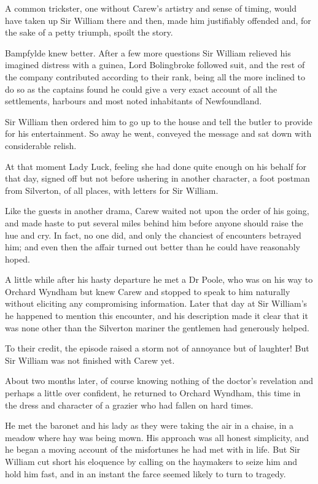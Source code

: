 A common trickster, one without Carew's artistry and sense of timing, would have taken up Sir William there and then, made him justifiably offended and, for the sake of a petty triumph, spoilt the story.

Bampfylde knew better. After a few more questions Sir William relieved his imagined distress with a guinea, Lord Bolingbroke followed suit, and the rest of the company contributed according to their rank, being all the more inclined to do so as the captains found he could give a very exact account of all the settlements, harbours and most noted inhabitants of Newfoundland.

Sir William then ordered him to go up to the house and tell the butler to provide for his entertainment. So away he went, conveyed the message and sat down with considerable relish.

At that moment Lady Luck, feeling she had done quite enough on his behalf for that day, signed off   but not before ushering in another character, a foot postman from Silverton, of all places, with letters for Sir William.

Like the guests in another drama, Carew waited not upon the order of his going, and made haste to put several miles behind him before anyone should raise the hue and cry. In fact, no one did, and only the chanciest of encounters betrayed him; and even then the affair turned out better than he could have reasonably hoped.

A little while after his hasty departure he met a Dr Poole, who was on his way to Orchard Wyndham but knew Carew and stopped to speak to him   naturally without eliciting any compromising information. Later that day at Sir William's he happened to mention this encounter, and his description made it clear that it was none other than the Silverton mariner the gentlemen had generously helped.

To their credit, the episode raised a storm not of annoyance but of laughter! But Sir William was not finished with Carew yet.

About two months later, of course knowing nothing of the doctor's revelation and perhaps a little over confident, he returned to Orchard Wyndham, this time in the dress and character of a grazier who had fallen on hard times.

He met the baronet and his lady as they were taking the air in a chaise, in a meadow where hay was being mown. His approach was all honest simplicity, and he began a moving account of the misfortunes he had met with in life. But Sir William cut short his eloquence by calling on the haymakers to seize him and hold him fast, and in an instant the farce seemed likely to turn to tragedy.


